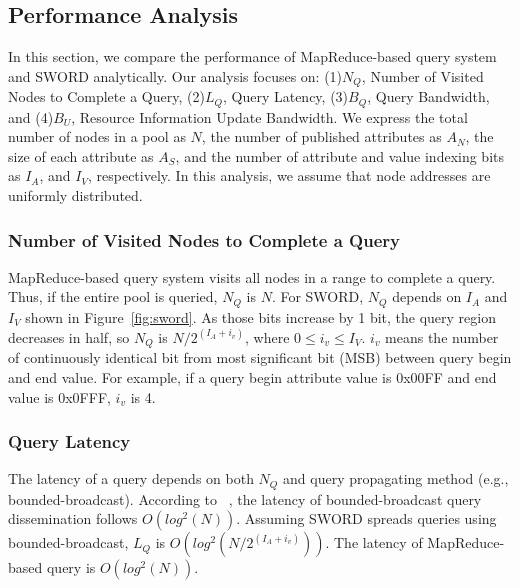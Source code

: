 \documentclass{acm_proc_article-sp}
\begin{document}
\subsection{Performance Analysis}
In this section, we compare the performance of MapReduce-based query system and SWORD analytically. 
Our analysis focuses on: (1)$N_Q$, Number of Visited Nodes to Complete a Query, (2)$L_Q$, Query Latency, (3)$B_Q$, Query Bandwidth, and (4)$B_U$, Resource Information Update Bandwidth.
We express the total number of nodes in a pool as $N$, the number of published attributes as $A_N$, the size of each attribute as $A_S$, 
and the number of attribute and value indexing bits as $I_A$, and $I_V$, respectively. In this analysis, we assume that node addresses are uniformly distributed.

\subsubsection{Number of Visited Nodes to Complete a Query}
MapReduce-based query system visits all nodes in a range to complete a query. Thus, if the entire pool is queried, $N_Q$ is $N$.
For SWORD, $N_Q$ depends on $I_A$ and $I_V$ shown in Figure~\ref{fig:sword}. As those bits increase by 1 bit, 
the query region decreases in half, so $N_Q$ is \begin{math}N/2^{(I_A+i_v)}\end{math}, where \begin{math}0\leq i_v\leq I_V\end{math}.
\begin{math}i_v\end{math} means the number of continuously identical bit from most significant bit (MSB) between query begin and end value. 
For example, if a query begin attribute value is 0x00FF and end value is 0x0FFF, \begin{math}i_v\end{math} is 4. 
\subsubsection{Query Latency}
The latency of a query depends on both $N_Q$ and query propagating method (e.g., bounded-broadcast). 
According to ~\cite{deetoo}, the latency of bounded-broadcast query dissemination follows \begin{math}O(log^2(N))\end{math}. Assuming SWORD spreads queries using bounded-broadcast,
$L_Q$ is \begin{math}O(log^2(N/2^{(I_A+i_v)}))\end{math}. The latency of MapReduce-based query is \begin{math}O(log^2(N))\end{math}.
\end{document}
